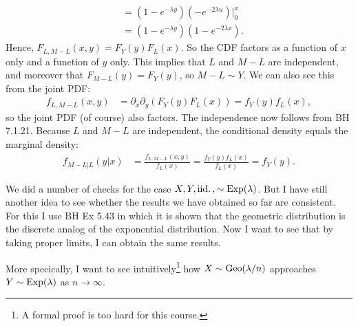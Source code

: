 \documentclass[a4paper,11pt]{article}
\begin{document}
\begin{exercise}
\begin{solution}
\begin{align}
&= (1-e^{-\lambda y}) ( -e^{-2\lambda u}) \biggr|_0^{x} \\
&= (1-e^{-\lambda y})(1- e^{-2\lambda x}).
\end{align}
Hence, $F_{L,M-L}(x,y) = F_Y(y) F_L(x)$. So the CDF factors as a function of $x$ only and a function of $y$ only. This implies that $L$ and $M-L$ are independent, and moreover that $F_{M-L}(y) =  F_Y(y)$, so $M-L \sim Y$. We can also see this from the joint PDF:
\begin{align}
f_{L, M-L}(x,y) &= \partial_x \partial_y (F_Y(y) F_L(x)) = f_Y(y) f_L(x),
\end{align}
so the joint PDF (of course) also factors. The independence now follows from BH 7.1.21.
Because $L$ and $M-L$ are independent, the conditional density equals the marginal density:
\begin{align}
f_{M-L|L}(y|x) &= \frac{f_{L, M-L}(x, y)}{f_L(x)} = \frac{f_Y(y) f_L(x)}{f_L(x)} = f_Y(y).
\end{align}
\end{solution}
\end{exercise}


We did a number of checks for the case $X, Y, \mathrm{iid.}\,, \sim\mathrm{Exp}(\lambda)$.
But I have still another idea to see whether the results we have obtained so far are consistent.
For this I use BH Ex 5.43 in which it is shown that the geometric distribution is the discrete analog of the exponential distribution.
Now I want to see that  by taking proper limits, I can  obtain the same results.

More specically, I want to see intuitively\footnote{A formal proof is too hard for this course.} how $X\sim \mathrm{Geo}(\lambda/n)$ approaches  $Y\sim\mathrm{Exp}(\lambda)$ as $n\to\infty$.
\end{document}
